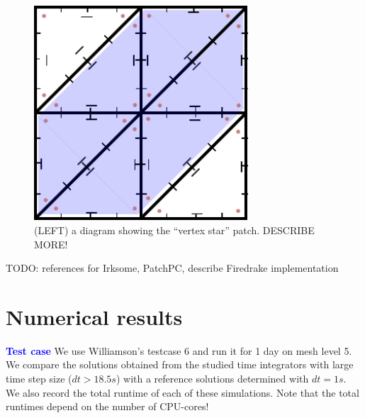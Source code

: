 \documentclass[a4paper]{article}
\begin{document}
 \begin{figure}
  \includegraphics[width=8cm]{Images/patch}
  \caption{\label{fig:patch} (LEFT) a diagram showing the ``vertex
    star'' patch. DESCRIBE MORE!}
 \end{figure}
 
TODO: references for Irksome, PatchPC, describe Firedrake implementation

\section{Numerical results}


\noindent \textcolor{blue}{\textbf{Test case}}
We use Williamson's testcase 6 and run it for 1 day on mesh level 5.
We compare the solutions obtained from the studied time integrators with
large time step size ($dt >18.5s$) with a reference solutions determined with $dt=1s$.
We also record the total runtime of each of these simulations.
Note that the total runtimes depend on the number of CPU-cores!
\vspace{0.6cm}
\end{document}

